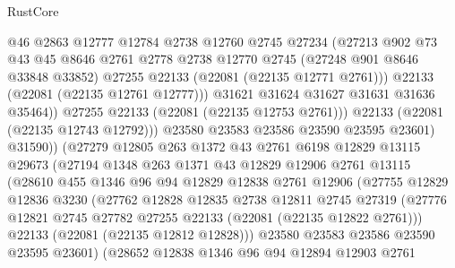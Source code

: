 \begin{lexlean}{RustCore}
\begin{coremodule}
                        @46
                        @2863
                        @12777
                        @12784
                        @2738
                        @12760
                        @2745
                        @27234
                        (@27213
                          @902
                          @73
                          @43
                          @45
                          @8646
                          @2761
                          @2778
                          @2738
                          @12770
                          @2745
                          (@27248 @901 @8646 @33848 @33852)
                          @27255
                          @22133
                          (@22081 (@22135 @12771 @2761)))
                        @22133
                        (@22081 (@22135 @12761 @12777)))
                      @31621
                      @31624
                      @31627
                      @31631
                      @31636
                      @35464))
                  @27255
                  @22133
                  (@22081 (@22135 @12753 @2761)))
                @22133
                (@22081 (@22135 @12743 @12792)))
              @23580
              @23583
              @23586
              @23590
              @23595
              @23601)
            @31590))
        (@27279
          @12805
          @263
          @1372
          @43
          @2761
          @6198
          @12829
          @13115
          @29673
          (@27194
            @1348
            @263
            @1371
            @43
            @12829
            @12906
            @2761
            @13115
            (@28610
              @455
              @1346
              @96
              @94
              @12829
              @12838
              @2761
              @12906
              (@27755
                @12829
                @12836
                @3230
                (@27762
                  @12828
                  @12835
                  @2738
                  @12811
                  @2745
                  @27319
                  (@27776 @12821 @2745 @27782 @27255 @22133 (@22081 (@22135 @12822 @2761)))
                  @22133
                  (@22081 (@22135 @12812 @12828)))
                @23580
                @23583
                @23586
                @23590
                @23595
                @23601)
              (@28652
                @12838
                @1346
                @96
                @94
                @12894
                @12903
                @2761

\end{coremodule}
\end{lexlean}
